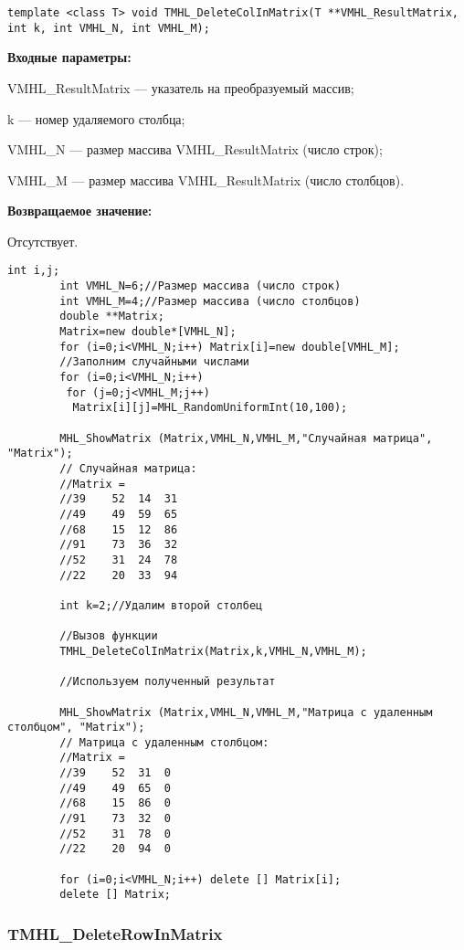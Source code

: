 \documentclass[a4paper,12pt]{article}
\begin{document}
\begin{lstlisting}[label=code_syntax_TMHL_DeleteColInMatrix,caption=Синтаксис]
template <class T> void TMHL_DeleteColInMatrix(T **VMHL_ResultMatrix, int k, int VMHL_N, int VMHL_M);
\end{lstlisting}

\textbf{Входные параметры:}  
 
VMHL\_ResultMatrix --- указатель на преобразуемый массив;
 
k --- номер удаляемого столбца;
 
VMHL\_N --- размер массива VMHL\_ResultMatrix (число строк);
 
VMHL\_M --- размер массива VMHL\_ResultMatrix (число столбцов).

\textbf{Возвращаемое значение:}

Отсутствует.


\begin{lstlisting}[label=code_use_TMHL_DeleteColInMatrix,caption=Пример использования]
        int i,j;
        int VMHL_N=6;//Размер массива (число строк)
        int VMHL_M=4;//Размер массива (число столбцов)
        double **Matrix;
        Matrix=new double*[VMHL_N];
        for (i=0;i<VMHL_N;i++) Matrix[i]=new double[VMHL_M];
        //Заполним случайными числами
        for (i=0;i<VMHL_N;i++)
         for (j=0;j<VMHL_M;j++)
          Matrix[i][j]=MHL_RandomUniformInt(10,100);

        MHL_ShowMatrix (Matrix,VMHL_N,VMHL_M,"Случайная матрица", "Matrix");
        // Случайная матрица:
        //Matrix =
        //39	52	14	31
        //49	49	59	65
        //68	15	12	86
        //91	73	36	32
        //52	31	24	78
        //22	20	33	94

        int k=2;//Удалим второй столбец

        //Вызов функции
        TMHL_DeleteColInMatrix(Matrix,k,VMHL_N,VMHL_M);

        //Используем полученный результат

        MHL_ShowMatrix (Matrix,VMHL_N,VMHL_M,"Матрица с удаленным столбцом", "Matrix");
        // Матрица с удаленным столбцом:
        //Matrix =
        //39	52	31	0
        //49	49	65	0
        //68	15	86	0
        //91	73	32	0
        //52	31	78	0
        //22	20	94	0

        for (i=0;i<VMHL_N;i++) delete [] Matrix[i];
        delete [] Matrix;
\end{lstlisting}

\subsubsection{TMHL\_DeleteRowInMatrix}\label{TMHL_DeleteRowInMatrix}
\end{document}
